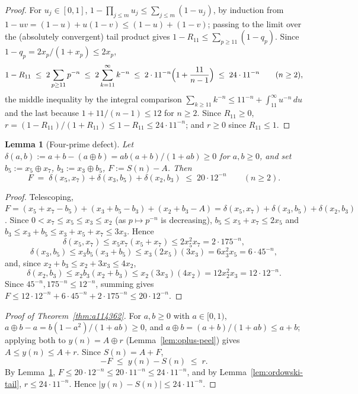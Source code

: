\documentclass[11pt]{article}
\theoremstyle{plain}
\newtheorem{lemma}[theorem]{Lemma}
\theoremstyle{definition}
\theoremstyle{remark}
\numberwithin{equation}{section}
\begin{document}
\begin{proof}
For $u_j \in [0,1]$, $1 - \prod_{j\le m} u_j \le \sum_{j \le m}(1-u_j)$, by induction from
$1-uv = (1-u)+u(1-v) \le (1-u)+(1-v)$; passing to the limit over the (absolutely convergent) tail
product gives $1-R_{11} \le \sum_{p \ge 11}(1-q_p)$. Since $1-q_p = 2x_p/(1+x_p) \le 2x_p$,
\[
  1 - R_{11} \;\le\; 2\sum_{p \ge 11} p^{-n} \;\le\; 2\sum_{k=11}^{\infty} k^{-n}
  \;\le\; 2\cdot 11^{-n}\Bigl(1+\frac{11}{n-1}\Bigr) \;\le\; 24\cdot 11^{-n} \qquad (n \ge 2),
\]
the middle inequality by the integral comparison $\sum_{k\ge11}k^{-n} \le
11^{-n}+\int_{11}^\infty u^{-n}\,du$ and the last because $1+11/(n-1) \le 12$ for $n \ge 2$. Since
$R_{11} \ge 0$, $r = (1-R_{11})/(1+R_{11}) \le 1-R_{11} \le 24\cdot11^{-n}$; and $r\ge0$ since
$R_{11}\le1$.
\end{proof}

\begin{lemma}[Four-prime defect]
\label{lem:ordowski-defect}
Let $\delta(a,b) := a+b-(a\oplus b) = ab(a+b)/(1+ab) \ge 0$ for $a,b \ge 0$, and set
$b_5 := x_5\oplus x_7$, $b_3 := x_3\oplus b_5$, $F := S(n) - A$. Then
\[
  F \;=\; \delta(x_5,x_7) + \delta(x_3,b_5) + \delta(x_2,b_3) \;\le\; 20\cdot12^{-n} \qquad
  (n\ge2).
\]
\end{lemma}

\begin{proof}
Telescoping,
$F = (x_5+x_7-b_5)+(x_3+b_5-b_3)+(x_2+b_3-A) = \delta(x_5,x_7)+\delta(x_3,b_5)+\delta(x_2,b_3)$.
Since $0 < x_7 \le x_5 \le x_3 \le x_2$ (as $p \mapsto p^{-n}$ is decreasing), $b_5 \le x_5+x_7 \le
2x_5$ and $b_3 \le x_3+b_5 \le x_3+x_5+x_7 \le 3x_3$. Hence
\[
  \delta(x_5,x_7) \le x_5x_7(x_5+x_7) \le 2x_5^2x_7 = 2\cdot175^{-n},
\]
\[
  \delta(x_3,b_5) \le x_3b_5(x_3+b_5) \le x_3(2x_5)(3x_3) = 6x_3^2x_5 = 6\cdot45^{-n},
\]
and, since $x_2+b_3 \le x_2+3x_3 \le 4x_2$,
\[
  \delta(x_2,b_3) \le x_2b_3(x_2+b_3) \le x_2(3x_3)(4x_2) = 12x_2^2x_3 = 12\cdot12^{-n}.
\]
Since $45^{-n}, 175^{-n} \le 12^{-n}$, summing gives $F \le 12\cdot12^{-n}+6\cdot45^{-n}+
2\cdot175^{-n} \le 20\cdot12^{-n}$.
\end{proof}

\begin{proof}[Proof of Theorem~\ref{thm:a114362}]
For $a,b \ge 0$ with $a \in [0,1)$, $a\oplus b - a = b(1-a^2)/(1+ab) \ge 0$, and
$a\oplus b = (a+b)/(1+ab) \le a+b$; applying both to $y(n) = A\oplus r$
(Lemma~\ref{lem:oplus-peel}) gives $A \le y(n) \le A+r$. Since $S(n) = A+F$,
\[
  -F \;\le\; y(n)-S(n) \;\le\; r.
\]
By Lemma~\ref{lem:ordowski-defect}, $F \le 20\cdot12^{-n} \le 20\cdot11^{-n} \le 24\cdot11^{-n}$,
and by Lemma~\ref{lem:ordowski-tail}, $r \le 24\cdot11^{-n}$. Hence $|y(n)-S(n)| \le 24\cdot
11^{-n}$.
\end{proof}
\end{document}
